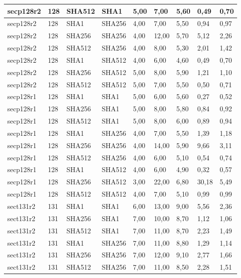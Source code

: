 \begin{longtable}{| l | l | l | l | l |l |l |l |l |}
secp128r2 & 128 & SHA512 & SHA1 & 5,00 & 7,00 & 5,60 & 0,49 & 0,70 \\ \hline 
secp128r2 & 128 & SHA1 & SHA256 & 4,00 & 7,00 & 5,50 & 0,94 & 0,97 \\ \hline 
secp128r2 & 128 & SHA256 & SHA256 & 4,00 & 12,00 & 5,70 & 5,12 & 2,26 \\ \hline 
secp128r2 & 128 & SHA512 & SHA256 & 4,00 & 8,00 & 5,30 & 2,01 & 1,42 \\ \hline 
secp128r2 & 128 & SHA1 & SHA512 & 4,00 & 6,00 & 4,60 & 0,49 & 0,70 \\ \hline 
secp128r2 & 128 & SHA256 & SHA512 & 5,00 & 8,00 & 5,90 & 1,21 & 1,10 \\ \hline 
secp128r2 & 128 & SHA512 & SHA512 & 5,00 & 7,00 & 5,50 & 0,50 & 0,71 \\ \hline 
secp128r1 & 128 & SHA1 & SHA1 & 5,00 & 6,00 & 5,60 & 0,27 & 0,52 \\ \hline 
secp128r1 & 128 & SHA256 & SHA1 & 5,00 & 8,00 & 5,80 & 0,84 & 0,92 \\ \hline 
secp128r1 & 128 & SHA512 & SHA1 & 5,00 & 8,00 & 6,00 & 0,89 & 0,94 \\ \hline 
secp128r1 & 128 & SHA1 & SHA256 & 4,00 & 7,00 & 5,50 & 1,39 & 1,18 \\ \hline 
secp128r1 & 128 & SHA256 & SHA256 & 4,00 & 14,00 & 5,90 & 9,66 & 3,11 \\ \hline 
secp128r1 & 128 & SHA512 & SHA256 & 4,00 & 6,00 & 5,10 & 0,54 & 0,74 \\ \hline 
secp128r1 & 128 & SHA1 & SHA512 & 4,00 & 6,00 & 4,90 & 0,32 & 0,57 \\ \hline 
secp128r1 & 128 & SHA256 & SHA512 & 3,00 & 22,00 & 6,80 & 30,18 & 5,49 \\ \hline 
secp128r1 & 128 & SHA512 & SHA512 & 4,00 & 7,00 & 5,10 & 0,99 & 0,99 \\ \hline 
sect131r2 & 131 & SHA1 & SHA1 & 6,00 & 13,00 & 9,00 & 5,56 & 2,36 \\ \hline 
sect131r2 & 131 & SHA256 & SHA1 & 7,00 & 10,00 & 8,70 & 1,12 & 1,06 \\ \hline 
sect131r2 & 131 & SHA512 & SHA1 & 7,00 & 11,00 & 8,70 & 2,23 & 1,49 \\ \hline 
sect131r2 & 131 & SHA1 & SHA256 & 7,00 & 11,00 & 8,80 & 1,29 & 1,14 \\ \hline 
sect131r2 & 131 & SHA256 & SHA256 & 7,00 & 12,00 & 9,10 & 2,77 & 1,66 \\ \hline 
sect131r2 & 131 & SHA512 & SHA256 & 7,00 & 11,00 & 8,50 & 2,28 & 1,51 \\ \hline 

\end{longtable}
